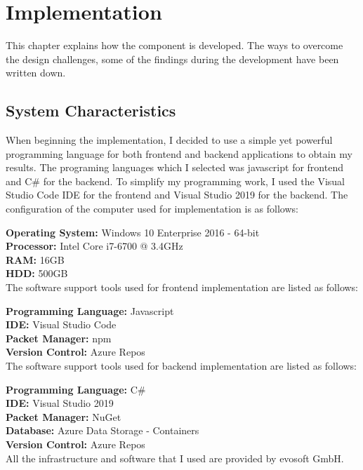 %
\section{Implementation}\label{sec:implementation}
This chapter explains how the component is developed. The ways to overcome the design challenges, some of the findings during the development have been written down.
%
\subsection{System Characteristics}
When beginning the implementation, I decided to use a simple yet powerful programming language for both frontend and backend applications to obtain my results. The programing languages which I selected was javascript for frontend and C\# for the backend. To simplify my programming work, I used the Visual Studio Code IDE for the frontend and Visual Studio 2019 for the backend. The configuration of the computer used for implementation is as follows:

{\bf Operating System:} Windows 10 Enterprise 2016 - 64-bit\\
{\bf Processor:} Intel Core i7-6700 @ 3.4GHz\\
{\bf RAM:} 16GB\\
{\bf HDD:} 500GB\\


The software support tools used for frontend implementation are listed as follows:

{\bf Programming Language:} Javascript\\
{\bf IDE:} Visual Studio Code\\
{\bf Packet Manager:} npm\\
{\bf Version Control:} Azure Repos\\


The software support tools used for backend implementation are listed as follows:

{\bf Programming Language:} C\#\\
{\bf IDE:} Visual Studio 2019\\
{\bf Packet Manager:} NuGet\\
{\bf Database:} Azure Data Storage - Containers\\
{\bf Version Control:} Azure Repos\\


All the infrastructure and software that I used are provided by evosoft GmbH.
